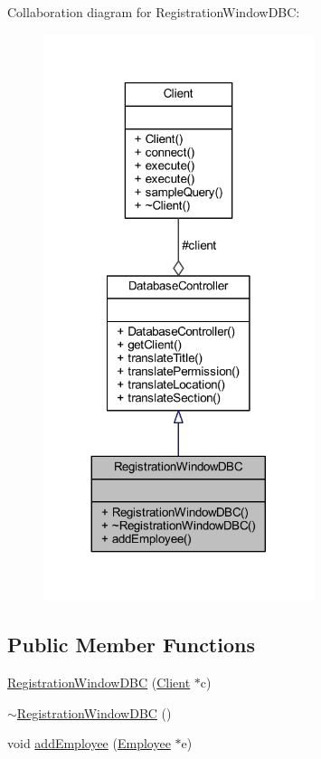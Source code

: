 Collaboration diagram for Registration\+Window\+D\+B\+C\+:
\nopagebreak
\begin{figure}[H]
\begin{center}
\leavevmode
\includegraphics[width=224pt]{class_registration_window_d_b_c__coll__graph}
\end{center}
\end{figure}
\subsection*{Public Member Functions}
\begin{DoxyCompactItemize}
\item 
\hyperlink{class_registration_window_d_b_c_a30491b514fcbcdc13ed8ed49ce25fb01}{Registration\+Window\+D\+B\+C} (\hyperlink{class_client}{Client} $\ast$c)
\item 
\hyperlink{class_registration_window_d_b_c_a6afe146cb07114694f6f5d11484505aa}{$\sim$\+Registration\+Window\+D\+B\+C} ()
\item 
void \hyperlink{class_registration_window_d_b_c_a41eec10a528205645d3a43aea4d42da3}{add\+Employee} (\hyperlink{class_employee}{Employee} $\ast$e)
\end{DoxyCompactItemize}
